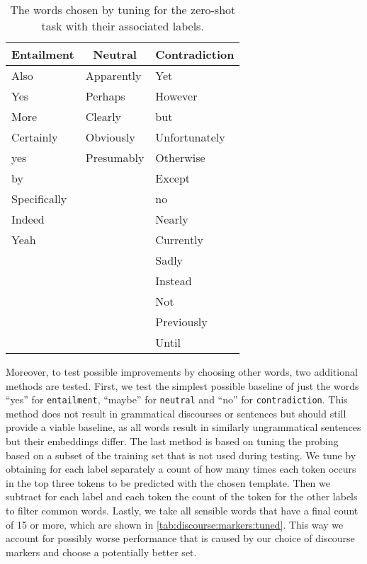 \begin{table}[ht]
    \centering
    \caption{The words chosen by tuning for the zero-shot task with their associated labels.}
    \small
    \begin{tabular}{l | l | l}
        \multicolumn{1}{c|}{Entailment} & \multicolumn{1}{c|}{Neutral} & \multicolumn{1}{c}{Contradiction} \\
        \hline
        Also & Apparently & Yet \\
        Yes & Perhaps & However \\
        More & Clearly & but \\
        Certainly & Obviously & Unfortunately \\
        yes & Presumably & Otherwise \\
        by &  & Except \\
        Specifically &  & no \\
        Indeed &  & Nearly \\
        Yeah &  & Currently \\
        &  & Sadly \\
        &  & Instead \\
        &  & Not \\
        &  & Previously \\
        &  & Until \\
    \end{tabular}
    \label{tab:discourse:markers:tuned}
\end{table}

Moreover, to test possible improvements by choosing other words, two additional methods are tested. First, we test the simplest possible baseline of just the words \enquote{yes} for \texttt{entailment}, \enquote{maybe} for \texttt{neutral} and \enquote{no} for \texttt{contradiction}. This method does not result in grammatical discourses or sentences but should still provide a viable baseline, as all words result in similarly ungrammatical sentences but their embeddings differ. The last method is based on tuning the probing based on a subset of the training set that is not used during testing. We tune by obtaining for each label separately a count of how many times each token occurs in the top three tokens to be predicted with the chosen template. Then we subtract for each label and each token the count of the token for the other labels to filter common words. Lastly, we take all sensible words that have a final count of 15 or more, which are shown in \autoref{tab:discourse:markers:tuned}. This way we account for possibly worse performance that is caused by our choice of discourse markers and choose a potentially better set.

